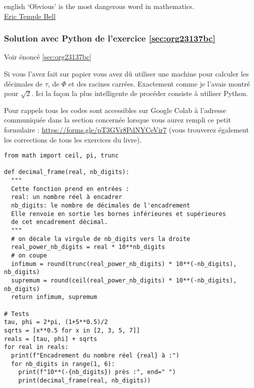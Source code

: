 \documentclass[a4paper, 11pt, twoside]{article}
\begin{document}
\begin{foreigndisplayquote}{english}
‘Obvious’ is the most dangerous word in mathematics.\\

\href{https://en.wikipedia.org/wiki/Eric\_Temple\_Bell}{Eric Temple Bell}
\end{foreigndisplayquote}

\startcontents[level-2]

\subsubsection{Solution avec Python de l'exercice \ref{sec:org23137bc}}
\label{sec:orge3130dd}
Voir énoncé \ref{sec:org23137bc}

Si vous l'avez fait sur papier vous avez dû utiliser une machine
pour calculer les décimales de \(\tau\), de \(\Phi\) et des racines
carrées. Exactement comme je l'avais montré pour \(\sqrt{2}\). Ici
la façon la plus intelligente de procéder consiste à utiliser
Python.

Pour rappels tous les codes sont accessibles sur Google Colab à
l'adresse communiquée dans la section concernée lorsque vous
aurez rempli ce petit formulaire :
\url{https://forms.gle/pT3GVr8PdNYCeVir7} (vous trouverez également
les corrections de tous les exercices du livre).

\begin{verbatim}
from math import ceil, pi, trunc

def decimal_frame(real, nb_digits):
  """
  Cette fonction prend en entrées : 
  real: un nombre réel à encadrer
  nb_digits: le nombre de décimales de l'encadrement
  Elle renvoie en sortie les bornes inférieures et supérieures 
  de cet encadrement décimal.
  """
  # on décale la virgule de nb_digits vers la droite
  real_power_nb_digits = real * 10**nb_digits 
  # on coupe
  infimum = round(trunc(real_power_nb_digits) * 10**(-nb_digits), nb_digits)
  supremum = round(ceil(real_power_nb_digits) * 10**(-nb_digits), nb_digits)
  return infimum, supremum

# Tests
tau, phi = 2*pi, (1+5**0.5)/2
sqrts = [x**0.5 for x in [2, 3, 5, 7]]
reals = [tau, phi] + sqrts
for real in reals:
  print(f"Encadrement du nombre réel {real} à :")
  for nb_digits in range(1, 6): 
    print(f"10**(-{nb_digits}) près :", end=" ")
    print(decimal_frame(real, nb_digits))
\end{verbatim}
\stopcontents[level-2]
\end{document}
